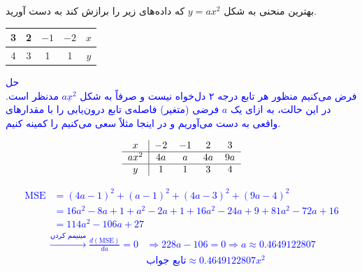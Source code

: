بهترین منحنی به شکل 
$y = ax^2$
که داده‌های زیر را برازش کند به دست آورید.
	\begin{center}
		\begin{tabular}{c | c | c | c | c }
			3 & 2 & $-1$ & $-2$ & $x$ \\
			\hline
			4 & 3 & 1 & 1 & $y$ 
			
		\end{tabular}
	\end{center}
\textcolor{blue}{
حل
\\
فرض می‌کنیم منظور هر تابع درجه ۲ دل‌خواه نیست و صرفاً به شکل 
$\underline{ax^2}$
مدنظر است.
در این حالت، به ازای یک 
$a$
فرضی (متغیر) فاصله‌ی تابع درون‌یابی را با مقدارهای واقعی به دست می‌آوریم و در اینجا مثلاً سعی می‌کنیم
را کمینه کنیم.
\begin{latin}
    \begin{align*}
        \begin{tabular}{ c|cccc } 
         $x$ & $-2$ & $-1$ & $2$ & $3$ \\
         \hline
         $ax^2$ & $4a$ & $a$ & $4a$ & $9a$ \\
         \hline
         $y$ & $1$ & $1$ & $3$ & $4$ \\
        \end{tabular}
    \end{align*}
\end{latin}
\begin{align*}
    \text{MSE} &= (4a - 1)^2 + (a - 1)^2 + (4a - 3)^2 + (9a - 4)^2 \\
    &= 16a^2 - 8a + 1 + a^2 - 2a + 1 + 16 a^2 - 24a + 9 + 81a^2 - 72a + 16 \\
    &= 114 a^2 - 106a + 27
\end{align*}
\begin{align*}
    \xrightarrow{\text{مینیمم کردن}}
    \frac{d (\text{MSE})}{da} = 0 &\Rightarrow 228a - 106 = 0 \Rightarrow a \approx 0.4649122807 \\
    &\text{تابع جواب} \approx 0.4649122807 x^2
\end{align*}
}
